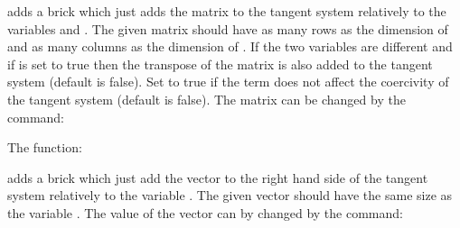 \documentclass[a4paper,11pt,english]{sphinxmanual}
\begin{document}
adds a brick which just adds the matrix  to the tangent system relatively to
the variables  and . The given matrix should have as many
rows as the dimension of  and as many columns as the dimension of
. If the two variables are different and if  is set to
true then the transpose of the matrix is also added to the tangent system (default
is false). Set  to true if the term does not affect the coercivity
of the tangent system (default is false). The matrix can be changed by the
command:

\begin{sphinxVerbatim}[commandchars=\\\{\}]
  
\end{sphinxVerbatim}

The function:

\begin{sphinxVerbatim}[commandchars=\\\{\}]
  
\end{sphinxVerbatim}

adds a brick which just add the vector  to the right hand side of the tangent
system relatively to the variable . The given vector should have the
same size as the variable . The value of the vector can by changed by
the command:

\begin{sphinxVerbatim}[commandchars=\\\{\}]
  
\end{sphinxVerbatim}

\ignorespaces 
\end{document}
